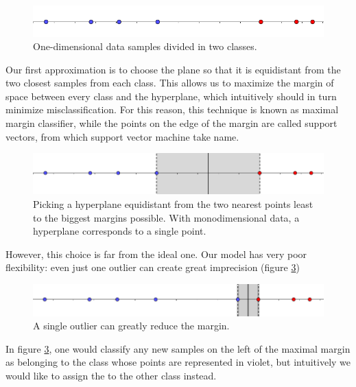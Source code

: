 \documentclass[a4paper]{report}
\begin{document}
\begin{figure} [H]
    \centering
    \includegraphics [width=\textwidth ]{svm/1dim.png}
    \caption{One-dimensional data samples divided in two classes.}
    \label{1dim}
\end{figure}


Our first approximation is to choose the plane so that it is equidistant from the two closest samples from each class.
This allows us to maximize the margin of space between every class and the hyperplane, which intuitively should in turn minimize misclassification.
For this reason, this technique is known as maximal margin classifier, while the points on the edge of the margin are called support vectors, from which support vector machine take name.

\begin{figure} [H]
    \centering
    \includegraphics [width=\textwidth ]{svm/1dim_disq.png}
    \caption{Picking a hyperplane equidistant from the two nearest points least to the biggest margins possible. With monodimensional data, a hyperplane corresponds to a single point.}
    \label{1dim1_disq}
\end{figure}

However, this choice is far from the ideal one.
Our model has very poor flexibility:
even just one outlier can create great imprecision (figure \ref{1dim_disq2})


\begin{figure} [H]
    \centering
    \includegraphics [width=\textwidth ]{svm/1dim_disq2.png}
    \caption{A single outlier can greatly reduce the margin.}
    \label{1dim_disq2}
\end{figure}

In figure \ref{1dim_disq2}, one would classify any new samples on the left of the maximal margin as belonging to the class whose points are represented in violet, but intuitively we would like to assign the to the other class instead.
\end{document}
